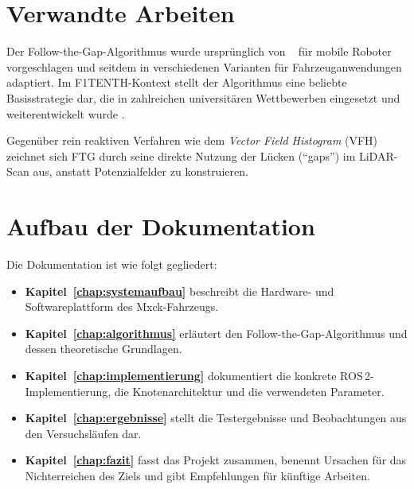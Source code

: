 \section{Verwandte Arbeiten}
\label{sec:related_work}

Der Follow-the-Gap-Algorithmus wurde ursprünglich von
\citeauthor{sezer2012novel}~\cite{sezer2012novel} für mobile Roboter
vorgeschlagen und seitdem in verschiedenen Varianten für
Fahrzeuganwendungen adaptiert.
Im F1TENTH-Kontext stellt der Algorithmus eine beliebte Basisstrategie
dar, die in zahlreichen universitären Wettbewerben eingesetzt und
weiterentwickelt wurde \cite{fulgentini2022comparative}.

Gegenüber rein reaktiven Verfahren wie dem \emph{Vector Field Histogram}
(VFH) \cite{ulrich1998vfh} zeichnet sich FTG durch seine direkte
Nutzung der Lücken (\enquote{gaps}) im LiDAR-Scan aus, anstatt
Potenzialfelder zu konstruieren.

\section{Aufbau der Dokumentation}
\label{sec:structure}

Die Dokumentation ist wie folgt gegliedert:

\begin{itemize}[leftmargin=*]
  \item \textbf{Kapitel~\ref{chap:systemaufbau}} beschreibt die
        Hardware- und Softwareplattform des Mxck-Fahrzeugs.
  \item \textbf{Kapitel~\ref{chap:algorithmus}} erläutert den
        Follow-the-Gap-Algorithmus und dessen theoretische Grundlagen.
  \item \textbf{Kapitel~\ref{chap:implementierung}} dokumentiert die
        konkrete ROS\,2-Implementierung, die Knotenarchitektur und
        die verwendeten Parameter.
  \item \textbf{Kapitel~\ref{chap:ergebnisse}} stellt die Testergebnisse
        und Beobachtungen aus den Versuchsläufen dar.
  \item \textbf{Kapitel~\ref{chap:fazit}} fasst das Projekt zusammen,
        benennt Ursachen für das Nichterreichen des Ziels und gibt
        Empfehlungen für künftige Arbeiten.
\end{itemize}
